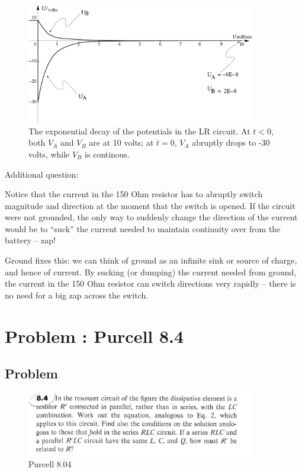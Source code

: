 \documentclass[solutions]{esg8022pset}
\begin{document}
\begin{figure}[H]
    \centering
    \includegraphics[width = 10cm]{graph22}
    \caption{The exponential decay of the potentials in the LR circuit.
At $t<0$, both $V_A$ and $V_B$ are at 10 volts; at $t=0$, $V_A$
abruptly drops to -30 volts, while $V_B$ is continous.}
    \label{fig:graph22.eps}
  \end{figure}


Additional question:

Notice that the current in the 150 Ohm resistor has to abruptly switch
magnitude and direction at the moment that the switch is opened. If
the circuit were not grounded, the only way to suddenly change the
direction of the current would be to ``suck'' the current needed to
maintain continuity over from the battery -- zap!

Ground fixes this: we can think of ground as an infinite sink or
source of charge, and hence of current. By sucking (or dumping) the
current needed from ground, the current in the 150 Ohm resistor can
switch directions very rapidly -- there is no need for a big zap
across the switch.


\section{Problem \thesection: Purcell 8.4}
\subsection{Problem}
\begin{figure}[H]
    \centering
    \includegraphics[width = 10cm]{pu804}
    \caption{Purcell 8.04}
  \end{figure}
\end{document}
